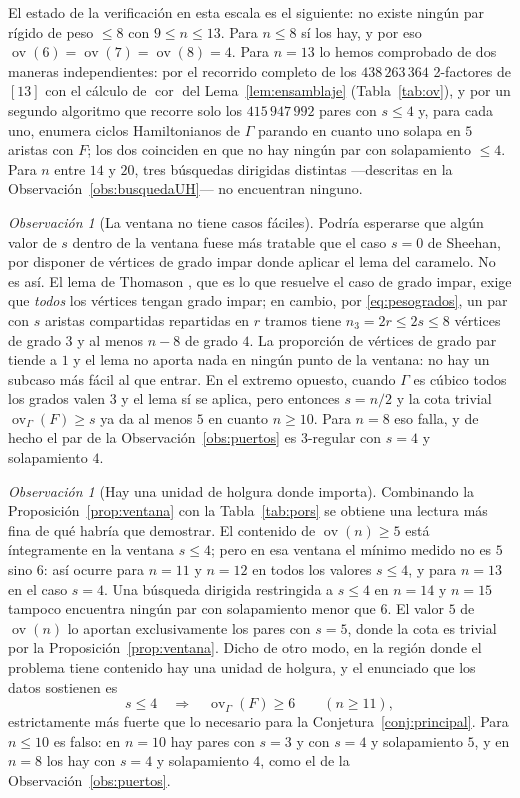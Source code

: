 \documentclass[11pt,a4paper]{article}
\theoremstyle{definition}
\theoremstyle{remark}
\newtheorem{observacion}[teorema]{Observación}
\newcommand{\ov}{\operatorname{ov}}
\newcommand{\cor}{\operatorname{cor}}
\begin{document}
El estado de la verificación en esta escala es el siguiente: no existe ningún par rígido de peso $\le8$ con $9\le n\le13$. Para $n\le8$ sí los hay, y por eso $\ov(6)=\ov(7)=\ov(8)=4$. Para $n=13$ lo hemos comprobado de dos maneras independientes: por el recorrido completo de los $438\,263\,364$ 2-factores de $[13]$ con el cálculo de $\cor$ del Lema~\ref{lem:ensamblaje} (Tabla~\ref{tab:ov}), y por un segundo algoritmo que recorre solo los $415\,947\,992$ pares con $s\le4$ y, para cada uno, enumera ciclos Hamiltonianos de $\Gamma$ parando en cuanto uno solapa en $5$ aristas con $F$; los dos coinciden en que no hay ningún par con solapamiento $\le4$. Para $n$ entre $14$ y $20$, tres búsquedas dirigidas distintas —descritas en la Observación~\ref{obs:busquedaUH}— no encuentran ninguno.

\begin{observacion}[La ventana no tiene casos fáciles]\label{obs:nofacil}
Podría esperarse que algún valor de $s$ dentro de la ventana fuese más tratable que el caso $s=0$ de Sheehan, por disponer de vértices de grado impar donde aplicar el lema del caramelo. No es así. El lema de Thomason \cite{thomason78}, que es lo que resuelve el caso de grado impar, exige que \emph{todos} los vértices tengan grado impar; en cambio, por \eqref{eq:pesogrados}, un par con $s$ aristas compartidas repartidas en $r$ tramos tiene $n_3=2r\le2s\le8$ vértices de grado $3$ y al menos $n-8$ de grado $4$. La proporción de vértices de grado par tiende a $1$ y el lema no aporta nada en ningún punto de la ventana: no hay un subcaso más fácil al que entrar. En el extremo opuesto, cuando $\Gamma$ es cúbico todos los grados valen $3$ y el lema sí se aplica, pero entonces $s=n/2$ y la cota trivial $\ov_\Gamma(F)\ge s$ ya da al menos $5$ en cuanto $n\ge10$. Para $n=8$ eso falla, y de hecho el par de la Observación~\ref{obs:puertos} es $3$-regular con $s=4$ y solapamiento $4$.
\end{observacion}

\begin{observacion}[Hay una unidad de holgura donde importa]\label{obs:holgura}
Combinando la Proposición~\ref{prop:ventana} con la Tabla~\ref{tab:pors} se obtiene una lectura más fina de qué habría que demostrar. El contenido de $\ov(n)\ge5$ está íntegramente en la ventana $s\le4$; pero en esa ventana el mínimo medido no es $5$ sino $6$: así ocurre para $n=11$ y $n=12$ en todos los valores $s\le4$, y para $n=13$ en el caso $s=4$. Una búsqueda dirigida restringida a $s\le4$ en $n=14$ y $n=15$ tampoco encuentra ningún par con solapamiento menor que $6$. El valor $5$ de $\ov(n)$ lo aportan exclusivamente los pares con $s=5$, donde la cota es trivial por la Proposición~\ref{prop:ventana}. Dicho de otro modo, en la región donde el problema tiene contenido hay una unidad de holgura, y el enunciado que los datos sostienen es
\[
s\le4 \quad\Longrightarrow\quad \ov_\Gamma(F)\ge 6\qquad(n\ge11),
\]
estrictamente más fuerte que lo necesario para la Conjetura~\ref{conj:principal}. Para $n\le10$ es falso: en $n=10$ hay pares con $s=3$ y con $s=4$ y solapamiento $5$, y en $n=8$ los hay con $s=4$ y solapamiento $4$, como el de la Observación~\ref{obs:puertos}.
\end{observacion}
\end{document}
